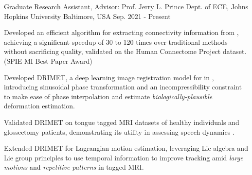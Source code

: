     \begin{cventries}
    \cventry
    {Graduate Research Assistant, Advisor: Prof. Jerry L. Prince} %
    {Dept. of  ECE, Johns Hopkins University} %
    {Baltimore, USA} %
    {Sep. 2021 - Present} %
    {
    	\begin{cvitems} %
    		\item{Developed an efficient algorithm for extracting connectivity information from , achieving a significant speedup of 30 to 120 times over traditional methods without sacrificing quality, validated on the Human Connectome Project dataset. (SPIE-MI Best Paper Award)}
		\item{Developed DRIMET, a deep learning image registration model for  in , introducing sinusoidal phase transformation and an incompressibility constraint to make ease of phase interpolation and estimate \textit{biologically-plausible} deformation estimation.}
		\item{Validated DRIMET on tongue tagged MRI datasets of healthy individuals and glossectomy patients, demonstrating its utility in assessing speech dynamics .}
		\item{Extended DRIMET for Lagrangian motion estimation, leveraging Lie algebra and Lie group principles to use temporal information to improve tracking amid \textit{large motions} and \textit{repetitive patterns} in tagged MRI.}

\end{cvitems}}
\end{cventries}
